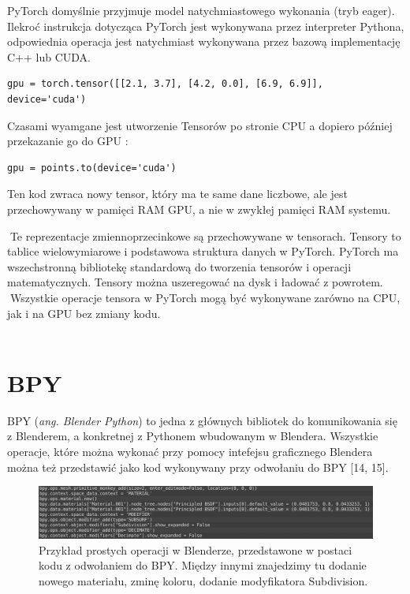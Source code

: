\documentclass[brudnopis]{xmgr}
\begin{document}
PyTorch domyślnie przyjmuje model natychmiastowego wykonania (tryb eager).
Ilekroć instrukcja dotycząca PyTorch jest wykonywana przez interpreter Pythona, odpowiednia operacja jest natychmiast wykonywana przez bazową implementację C++ lub CUDA. 


\begin{lstlisting}
gpu = torch.tensor([[2.1, 3.7], [4.2, 0.0], [6.9, 6.9]], device='cuda')
\end{lstlisting}

Czasami wyamgane jest utworzenie Tensorów po stronie CPU a dopiero później przekazanie go do GPU :

\begin{lstlisting}
gpu = points.to(device='cuda')
\end{lstlisting}


Ten kod zwraca nowy tensor, który ma te same dane liczbowe, ale jest przechowywany w pamięci RAM GPU, a nie w zwykłej pamięci RAM systemu.

􏰹Te reprezentacje zmiennoprzecinkowe są przechowywane w tensorach. Tensory to tablice wielowymiarowe i podstawowa struktura danych w PyTorch. PyTorch ma wszechstronną bibliotekę standardową do tworzenia tensorów i operacji matematycznych. Tensory można uszeregować na dysk i ładować z powrotem.
􏰹Wszystkie operacje tensora w PyTorch mogą być wykonywane zarówno na CPU, jak i na GPU bez zmiany kodu.
\\
\\
  \section{BPY\label{s:dsssl}}
  
  BPY (\textit{ang. Blender Python}) to jedna z głównych bibliotek do komunikowania się z Blenderem, a konkretnej z Pythonem wbudowanym w Blendera. Wszystkie operacje, które można wykonać przy pomocy intefejsu graficznego Blendera można też przedstawić jako kod wykonywany przy odwołaniu do BPY [14, 15].
  
  
  \begin{figure}[!tbh]
\centering
\includegraphics[width=1.1\hsize]{fig/8}
\caption{Przykład prostych operacji w Blenderze, przedstawone w postaci kodu z odwołaniem do BPY. Między innymi znajedzimy tu dodanie nowego materiału, zminę koloru, dodanie modyfikatora Subdivision.\label{RYS.3}}
\end{figure}
  
\end{document}
